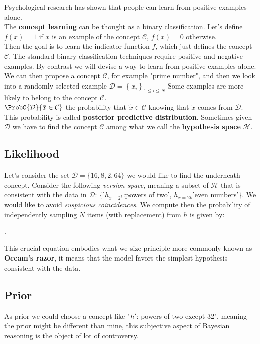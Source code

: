 Psychological research has shown that people can learn from positive examples alone.\\
The \textbf{concept learning} can be thought as a binary classification. Let's define 
$f(x) = 1$ if $x$ is an example of the concept $\mathcal{C}$, $f(x) = 0$ otherwise.\\
Then the goal is to learn the indicator function $f$, which just defines the concept 
$\mathcal{C}$. The standard binary classification techniques require positive and 
negative examples. By contrast we will devise a way to learn from positive examples alone.
We can then propose a concept $\mathcal{C}$, for example "prime number", and then we look
into a randomly selected example $\mathcal{D} = \left\{x_{i}\right\}_{1\leq i \leq N}$
Some examples are more likely to belong to the concept $\mathcal{C}$.\\
$\ProbC{\mathcal{D}}{\tilde{x} \in \mathcal{C}}$ the probability that $\tilde{x} \in 
\mathcal{C}$ knowing that $\tilde{x}$ comes from $\mathcal{D}$. This probability is called
\textbf{posterior predictive distribution}.
Sometimes given $\mathcal{D}$ we have to find the concept $\mathcal{C}$ among what we call
the \textbf{hypothesis space} $\mathcal{H}$. 

\subsection{Likelihood}
Let's consider the set $\mathcal{D}=\{16, 8, 2, 64\}$ we would like to find the underneath
concept. Consider the following \emph{version space}, meaning a subset of $\mathcal{H}$
that is consistent with the data in $\mathcal{D}$: \{'$h_{x=2^{k}}$:powers of two',
$h_{x=2k}$'even numbers'\}.
We would like to avoid \emph{suspicious coincidences}.
We compute then the probability of independently sampling $N$ items (with replacement) 
from $h$ is given by: 
\begin{center}
    . 
\end{center}

This crucial equation embodies what we size principle more commonly known as 
\textbf{Occam's razor}, it means that the model favors the simplest hypothesis consistent
with the data.

\subsection{Prior}
As prior we could choose a concept like "$h'$: powers of two except 32", meaning the prior
might be different than mine, this subjective aspect of Bayesian reasoning is the object
of lot of controversy. 

